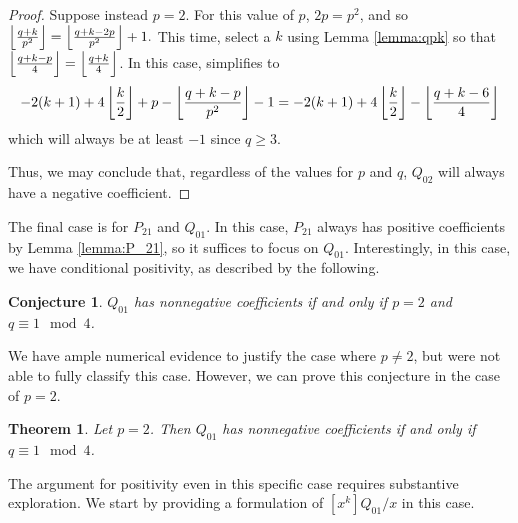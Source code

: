 \documentclass[11pt]{amsart}
\numberwithin{equation}{section}
\theoremstyle{plain}
\newtheorem{theorem}[equation]{Theorem}
\newtheorem{con}[equation]{Conjecture}
\theoremstyle{definition}
\begin{document}
\begin{proof}
 Suppose instead $p=2$. For this value of $p$, $2p=p^2$, and so $\left\lfloor {q+k\over p^2}\right\rfloor=\left\lfloor {q+k-2p\over p^2}\right\rfloor+1.$ This time, select a $k$ using Lemma \ref{lemma:qpk} so that 
$\left\lfloor{q+k-p\over 4}\right\rfloor=\left\lfloor{q+k\over 4}\right\rfloor$. 
In this case, simplifies to 
\[-2(k+1)+4\left\lfloor{k\over 2}\right\rfloor+p-\left\lfloor{q+k-p\over p^2}\right\rfloor-1=-2(k+1)+4\left\lfloor{k\over 2}\right\rfloor-\left\lfloor{q+k-6\over 4}\right\rfloor\]
which will always be at least $-1$ since $q\geq 3$.

Thus, we may conclude that, regardless of the values for $p$ and $q$, $Q_{02}$ will always have a negative coefficient.



\end{proof}


The final case is for $P_{21}$ and $Q_{01}$. In this case, $P_{21}$ always has positive coefficients by Lemma \ref{lemma:P_21}, so it suffices to focus on $Q_{01}$. Interestingly, in this case, we have conditional positivity, as described by the following. 

\begin{con}\label{con:q01}
$Q_{01}$ has nonnegative coefficients if and only if $p=2$ and $q\equiv 1 \mod 4$.
\end{con}

We have ample numerical evidence to justify the case where $p\neq 2$, but were not able to fully classify this case. However, we can prove this conjecture in the case of $p=2$.

\begin{theorem}\label{thm:q01_coeffs} Let $p=2$. Then $Q_{01}$ has nonnegative coefficients if and only if $q\equiv 1 \mod 4$.
\end{theorem}

The argument for positivity even in this specific case requires substantive exploration. We start by providing a formulation of $[x^k]Q_{01}/x$ in this case. 
\end{document}
